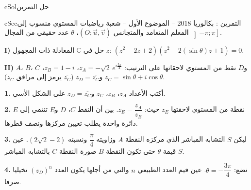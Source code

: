 \documentclass[12pt,a4paper]{article}
\newenvironment{BOX}[2]{\begin{otherlanguage}{english}\begin{arbox}{#1}{#2}}{\end{arbox}\end{otherlanguage}}
\newcounter{exo}
\newenvironment{tamrin}[1]{\stepcounter{exo}\begin{BOX}{cSec}{التمرين \theexo: #1}}{\end{BOX}}
\newenvironment{hal}{\Needspace{12\baselineskip}\begin{otherlanguage}{english}\begin{arbox}[breakable]{cSol}{حل التمرين \theexo}}{\end{arbox}\end{otherlanguage}}
\newenvironment{LTR}{\begin{otherlanguage}{english}}{\end{otherlanguage}}
\newcommand{\QQ}[1]{\par\smallskip\textbf{#1.} }
\begin{document}
\begin{hal}
\begin{center}
\begin{LTR}
\end{LTR}\end{center}
\end{hal}

\begin{tamrin}{بكالوريا 2018 -- الموضوع الأول -- شعبة رياضيات}
المستوي منسوب إلى المعلم المتعامد والمتجانس $\left(O;\vec u,\vec v\right)$، $\theta$ عدد حقيقي من المجال $\left]-\pi;\pi\right]$.

\textbf{I)} حل في $\mathbb{C}$ المعادلة ذات المجهول $z$: $\left(z^2-2z+2\right)\left(z^2-2(\sin\theta)z+1\right)=0$.

\textbf{II)} $A$، $B$، $C$ و$D$ نقط من المستوي لاحقاتها على الترتيب:
$z_A=-\sqrt2\,e^{i\frac{5\pi}{4}}$، $z_B=1-i$، $z_C=\sin\theta+i\cos\theta$ و$z_D=\overline{z_C}$ ($\overline{z_C}$ يرمز إلى مرافق $z_C$).

\QQ{1} أكتب الأعداد $z_A$، $z_B$، $z_C$ و$z_D=\overline{z_C}$ على الشكل الأسي.

\QQ{2} $E$ نقطة من المستوي لاحقتها $z_E$ حيث: $z_E=\dfrac{z_A}{z_B}$. بين أن النقط $C$، $D$ و$E$ تنتمي إلى دائرة واحدة يطلب تعيين مركزها ونصف قطرها.

\QQ{3} ليكن $S$ التشابه المباشر الذي مركزه النقطة $A$ وزاويته $\dfrac{\pi}{4}$ ونسبته $\left(2\sqrt2-2\right)$.
عين قيمة $\theta$ حتى تكون النقطة $B$ صورة النقطة $C$ بالتشابه المباشر $S$.

\QQ{4} نضع: $\theta=-\dfrac{3\pi}{4}$. عين قيم العدد الطبيعي $n$ والتي من أجلها يكون العدد $\left(z_D\right)^n$ تخيليا صرفا.
\end{tamrin}
\end{document}
